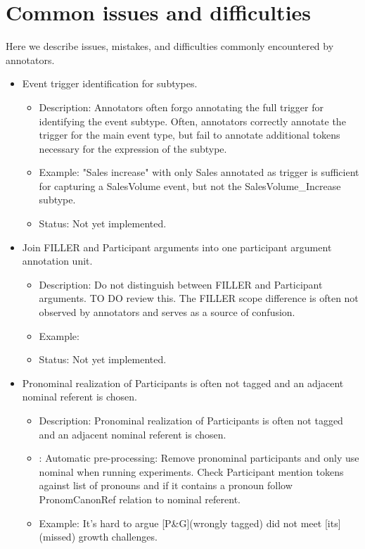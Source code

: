\section{Common issues and difficulties}
Here we describe issues, mistakes, and difficulties commonly encountered by annotators.

\begin{itemize}[leftmargin=*]
    \item Event trigger identification for subtypes.
        \begin{itemize} 
            \item Description: Annotators often forgo annotating the full trigger for identifying the event subtype. Often, annotators correctly annotate the trigger for the main event type, but fail to annotate additional tokens necessary for the expression of the subtype.
            \item Example: "Sales increase" with only Sales annotated as trigger is sufficient for capturing a SalesVolume event, but not the SalesVolume\_Increase subtype.
            \item Status: Not yet implemented.
        \end{itemize}
    \item Join FILLER and Participant arguments into one participant argument annotation unit.
        \begin{itemize}
            \item Description: Do not distinguish between FILLER and Participant arguments. TO DO review this. The FILLER scope difference is often not observed by annotators and serves as a source of confusion.
            \item Example:
            \item Status: Not yet implemented.
        \end{itemize}
    \item Pronominal realization of Participants is often not tagged and an adjacent nominal referent is chosen.
        \begin{itemize} 
            \item Description: Pronominal realization of Participants is often not tagged and an adjacent nominal referent is chosen.
            \item: Automatic pre-processing: Remove pronominal participants and only use nominal when running experiments. Check Participant mention tokens against list of pronouns and if it contains a pronoun follow PronomCanonRef relation to nominal referent.
            \item Example: It's hard to argue [P\&G](wrongly tagged) did not meet [its](missed) growth challenges.

\end{itemize}
\end{itemize}
